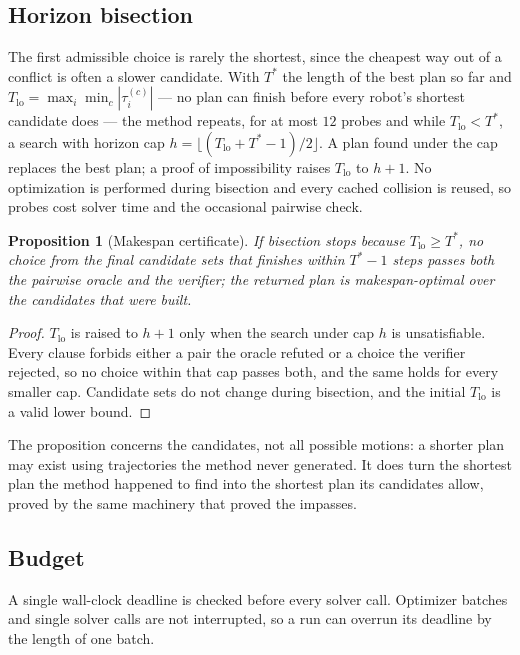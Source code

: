 \documentclass[conference]{IEEEtran}
\theoremstyle{plain}
\newtheorem{proposition}{Proposition}
\theoremstyle{definition}
\begin{document}
\subsection{Horizon bisection}
\label{sec:bisect}

The first admissible choice is rarely the shortest, since the cheapest way out of a conflict
is often a slower candidate. With $T^\ast$ the length of the best plan so far and
$T_{\text{lo}} = \max_i \min_c |\tau_i^{(c)}|$ --- no plan can finish before every robot's
shortest candidate does --- the method repeats, for at most $12$ probes and while
$T_{\text{lo}} < T^\ast$, a search with horizon cap
$h = \lfloor (T_{\text{lo}} + T^\ast - 1)/2 \rfloor$. A plan found under the cap replaces the
best plan; a proof of impossibility raises $T_{\text{lo}}$ to $h + 1$. No optimization is
performed during bisection and every cached collision is reused, so probes cost solver time
and the occasional pairwise check.

\begin{proposition}[Makespan certificate]
\label{prop:bisect}
If bisection stops because $T_{\text{lo}} \ge T^\ast$, no choice from the final candidate sets
that finishes within $T^\ast - 1$ steps passes both the pairwise oracle and the verifier; the
returned plan is makespan-optimal over the candidates that were built.
\end{proposition}

\begin{proof}
$T_{\text{lo}}$ is raised to $h+1$ only when the search under cap $h$ is unsatisfiable. Every
clause forbids either a pair the oracle refuted or a choice the verifier rejected, so no
choice within that cap passes both, and the same holds for every smaller cap. Candidate sets
do not change during bisection, and the initial $T_{\text{lo}}$ is a valid lower bound.
\end{proof}

The proposition concerns the candidates, not all possible motions: a shorter plan may exist
using trajectories the method never generated. It does turn the shortest plan the method
happened to find into the shortest plan its candidates allow, proved by the same machinery
that proved the impasses.

\subsection{Budget}

A single wall-clock deadline is checked before every solver call. Optimizer batches and
single solver calls are not interrupted, so a run can overrun its deadline by the length of
one batch.
\end{document}
